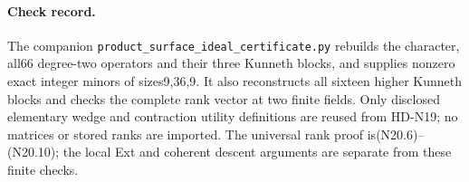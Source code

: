 \paragraph{Check record.}
The companion \texttt{product\_surface\_ideal\_certificate.py}
rebuilds the character, all66 degree-two operators and their
three Kunneth blocks, and supplies nonzero exact integer
minors of sizes9,36,9. It also reconstructs all sixteen
higher Kunneth blocks and checks the complete rank vector
at two finite fields. Only disclosed elementary wedge and
contraction utility definitions are reused from HD-N19;
no matrices or stored ranks are imported. The universal
rank proof is(N20.6)--(N20.10); the local Ext and coherent
descent arguments are separate from these finite checks.

